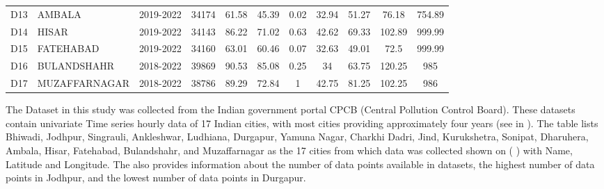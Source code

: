 \documentclass[a4paper, fleqn]{cas-sc}
\theoremstyle{definition}
\theoremstyle{remark}
\begin{document}
\begin{table}[h!]
\begin{tabular}{llccccccccc}
 D13 &  AMBALA         & 2019-2022 & 34174 & 61.58 & 45.39 & 0.02 & 32.94   & 51.27       & 76.18 & 754.89 \\
 D14 &  HISAR          & 2019-2022 & 34143 & 86.22 & 71.02 & 0.63 & 42.62   & 69.33       & 102.89 & 999.99 \\ 
 D15 &  FATEHABAD      & 2019-2022 & 34160 & 63.01 & 60.46 & 0.07 & 32.63   & 49.01       & 72.5    & 999.99 \\
 D16 &  BULANDSHAHR  & 2018-2022 & 39869  & 90.53 & 85.08 & 0.25 & 34      & 63.75       & 120.25  & 985    \\ 
 D17 &  MUZAFFARNAGAR  & 2018-2022 & 38786 & 89.29 & 72.84  & 1    & 42.75   & 81.25       & 102.25  & 986    \\ \hline
  \end{tabular}
  \end{table}
  
The Dataset in this study was collected from the Indian government portal CPCB (Central Pollution Control Board). These datasets contain univariate Time series hourly data of 17 Indian cities,  with most cities providing approximately four years (see in ). The table lists Bhiwadi,  Jodhpur,  Singrauli,  Ankleshwar,  Ludhiana,  Durgapur,  Yamuna Nagar,  Charkhi Dadri,  Jind,  Kurukshetra,  Sonipat,  Dharuhera,  Ambala,  Hisar,  Fatehabad,  Bulandshahr,  and Muzaffarnagar as the 17 cities from which data was collected shown on ( ) with Name,  Latitude and Longitude. The  also provides information about the number of data points available in datasets, the highest number of data points in Jodhpur, and the lowest number of data points in Durgapur.
\end{document}
